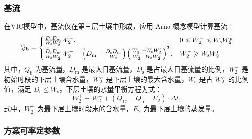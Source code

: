 \subsubsection{基流}

    在VIC模型中，基流仅在第三层土壤中形成，应用 Arno 概念模型计算基流：
    \begin{equation}
      Q_{\mathrm {b}}  = 
      \begin{cases}
        \frac{D_{\mathrm {s}}  D_{\mathrm {m}} }{W_{\mathrm {s}}  W_2^{\rm c}} W_2^-, & 0 \leqslant W_2^- \leqslant W_{\mathrm {s}}  W_2^{\rm c} \\
        \frac{D_{\mathrm {s}}  D_{\mathrm {m}} }{W_{\mathrm {s}}  W_2^{\rm c}} W_2^- + \left(D_{\mathrm {m}}  - \frac{D_{\mathrm {s}}  D_{\mathrm {m}} }{W_{\mathrm {s}} }\right) \left(\frac{W_2^--W_{\mathrm {s}}  W_2^{\rm c}}{W_2^{\rm c}-W_{\mathrm {s}}  W_2^{\rm c}}\right)^2,  & W_2^- \geqslant W_{\mathrm {s}}  W_2^{\rm c}
      \end{cases}
    \end{equation}
    其中，$Q_{\mathrm {b}} $ 为基流量，$D_{\mathrm {m}} $ 是最大日基流量，$D_{\mathrm {s}} $ 是占最大日基流量的比例，$W_2^-$ 是初始时段的下层土壤含水量，$W_2^{\rm c}$ 是下层土壤的最大含水量，$W_{\mathrm {s}} $ 是占 $W_2^{\rm c}$ 的比例值，满足 $D_{\mathrm {s}} \leqslant W_{\mathrm {s}} $。下层土壤的水量平衡方程为式：
    \begin{equation}
      W_2^+ = W_2^- + (Q_{12} - Q_{\mathrm {b}}  -E_2)\cdot\Delta t,
    \end{equation}
    式中，$W_2^+$ 为最下层土壤时段末的含水量，$E_2$ 为最下层土壤的蒸发量。

\subsubsection{方案可率定参数}

